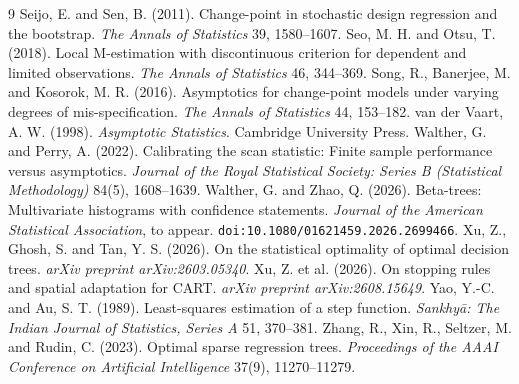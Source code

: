 \documentclass[11pt]{article}
\theoremstyle{plain}
\theoremstyle{definition}
\theoremstyle{remark}
\begin{document}
\begin{thebibliography}{9}
 Seijo, E. and Sen, B. (2011).
  Change-point in stochastic design regression and the bootstrap.
  \emph{The Annals of Statistics} 39, 1580--1607.
 Seo, M. H. and Otsu, T. (2018).
  Local M-estimation with discontinuous criterion for dependent and limited
  observations. \emph{The Annals of Statistics} 46, 344--369.
 Song, R., Banerjee, M. and Kosorok,
  M. R. (2016). Asymptotics for change-point models under varying degrees of
  mis-specification. \emph{The Annals of Statistics} 44, 153--182.
 van der Vaart, A. W. (1998).
  \emph{Asymptotic Statistics}. Cambridge University Press.
 Walther, G. and Perry, A.
  (2022). Calibrating the scan statistic: Finite sample performance versus
  asymptotics. \emph{Journal of the Royal Statistical Society: Series B
  (Statistical Methodology)} 84(5), 1608--1639.
 Walther, G. and Zhao, Q.
  (2026). Beta-trees: Multivariate histograms with confidence statements.
  \emph{Journal of the American Statistical Association}, to appear.
  \texttt{doi:10.1080/01621459.2026.2699466}.
 Xu, Z., Ghosh, S. and Tan, Y. S. (2026).
  On the statistical optimality of optimal decision trees. \emph{arXiv
  preprint arXiv:2603.05340}.
 Xu, Z. et al. (2026). On stopping
  rules and spatial adaptation for CART. \emph{arXiv preprint
  arXiv:2608.15649}.
 Yao, Y.-C. and Au, S. T. (1989).
  Least-squares estimation of a step function. \emph{Sankhy\=a: The Indian
  Journal of Statistics, Series A} 51, 370--381.
 Zhang, R., Xin, R., Seltzer, M.
  and Rudin, C. (2023). Optimal sparse regression trees. \emph{Proceedings
  of the AAAI Conference on Artificial Intelligence} 37(9), 11270--11279.
\end{thebibliography}
\end{document}
